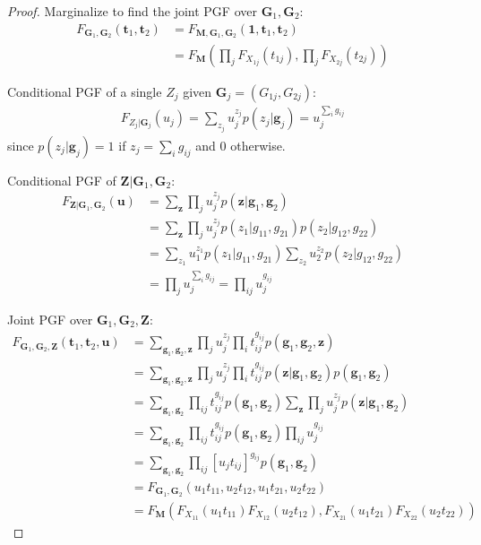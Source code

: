 \documentclass{article}
\begin{document}
\begin{proof}
Marginalize to find the joint PGF over $\mathbf{G}_1, \mathbf{G}_2$:
\begin{align*}
F_{\mathbf{G}_1, \mathbf{G}_2}(\mathbf{t}_1, \mathbf{t}_2)
&= F_{\mathbf{M}, \mathbf{G}_1, \mathbf{G}_2}(\mathbf{1}, \mathbf{t}_1, \mathbf{t}_2) \\
&= F_{\mathbf{M}}(\prod_j F_{X_{1j}}(t_{1j}), \prod_j F_{X_{2j}}(t_{2j}))
\end{align*}

Conditional PGF of a single $Z_j$ given $\mathbf{G}_{j} = (G_{1j}, G_{2j})$:
\begin{align*}
F_{Z_j|\mathbf{G}_j}(u_j) = \sum_{z_j} u_j^{z_j} p(z_j|\mathbf{g}_j)
= u_j^{\sum_i g_{ij}}
\end{align*}
since $p(z_j|\mathbf{g}_j) = 1$ if $z_j = \sum_i g_{ij}$ and $0$ otherwise.

Conditional PGF of $\mathbf{Z}|\mathbf{G}_1, \mathbf{G}_2$:
\begin{align*}
F_{\mathbf{Z}|\mathbf{G}_1, \mathbf{G}_2}(\mathbf{u})
&= \sum_{\mathbf{z}} \prod_j u_j^{z_j} p(\mathbf{z}|\mathbf{g}_1, \mathbf{g}_2) \\
&= \sum_{\mathbf{z}} \prod_j u_j^{z_j} p(z_1|g_{11}, g_{21}) p(z_2|g_{12}, g_{22}) \\
&= \sum_{z_1} u_1^{z_1} p(z_1|g_{11}, g_{21}) \sum_{z_2} u_2^{z_2} p(z_2|g_{12}, g_{22}) \\
&= \prod_j u_j^{\sum_i g_{ij}} = \prod_{ij} u_j^{g_{ij}}
\end{align*}

Joint PGF over $\mathbf{G}_1, \mathbf{G}_2, \mathbf{Z}$:
\begin{align*}
F_{\mathbf{G}_1, \mathbf{G}_2, \mathbf{Z}}(\mathbf{t}_1, \mathbf{t}_2, \mathbf{u})
&= \sum_{\mathbf{g}_1, \mathbf{g}_2, \mathbf{z}} \prod_{j} u_j^{z_j} \prod_i t_{ij}^{g_{ij}} p(\mathbf{g}_1, \mathbf{g}_2, \mathbf{z}) \\
&= \sum_{\mathbf{g}_1, \mathbf{g}_2, \mathbf{z}} \prod_{j} u_j^{z_j} \prod_i t_{ij}^{g_{ij}} p(\mathbf{z}|\mathbf{g}_1, \mathbf{g}_2)p(\mathbf{g}_1, \mathbf{g}_2) \\
&= \sum_{\mathbf{g}_1, \mathbf{g}_2} \prod_{ij} t_{ij}^{g_{ij}} p(\mathbf{g}_1, \mathbf{g}_2) \sum_{\mathbf{z}} \prod_j u_j^{z_j} p(\mathbf{z}|\mathbf{g}_1, \mathbf{g}_2) \\
&= \sum_{\mathbf{g}_1, \mathbf{g}_2} \prod_{ij} t_{ij}^{g_{ij}} p(\mathbf{g}_1, \mathbf{g}_2) \prod_{ij} u_j^{g_{ij}} \\
&= \sum_{\mathbf{g}_1, \mathbf{g}_2} \prod_{ij} [u_j t_{ij}]^{g_{ij}} p(\mathbf{g}_1, \mathbf{g}_2) \\
&= F_{\mathbf{G}_1, \mathbf{G}_2}(u_1 t_{11}, u_2 t_{12}, u_1 t_{21}, u_2 t_{22}) \\
&= F_{\mathbf{M}}(F_{X_{11}}(u_1 t_{11}) F_{X_{12}}(u_2 t_{12}), F_{X_{21}}(u_1 t_{21}) F_{X_{22}}(u_2 t_{22}))
\end{align*}


\end{proof}
\end{document}
